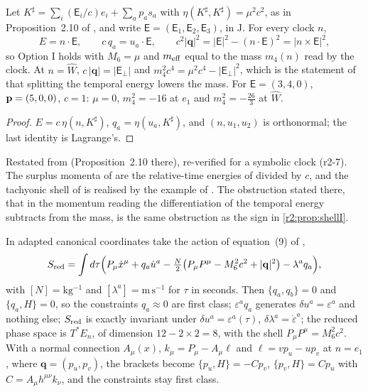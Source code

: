\begin{proposition}
\label{r2:prop:RE}
Let $K^\sharp=\sum_i(\mathsf E_i/c)e_i+\sum_ap_as_a$ with $\eta(K^\sharp,K^\sharp)=\mu^2c^2$, as in Proposition~2.10 of \cite{RE}, and write
$\boldsymbol{\mathsf E}=(\mathsf E_1,\mathsf E_2,\mathsf E_3)$, in $\mathrm J$. For every clock $n$,
\[
E=n\cdot\boldsymbol{\mathsf E},\qquad c\,q_a=u_a\cdot\boldsymbol{\mathsf E},\qquad c^2|\mathbf q|^2=|\boldsymbol{\mathsf E}|^2-(n\cdot\boldsymbol{\mathsf E})^2
=|n\times\boldsymbol{\mathsf E}|^2,
\]
so Option I holds with $M_6=\mu$ and $m_{\rm eff}$ equal to the mass $m_4(n)$ read by the clock. At $n=\widehat W$, $c\,|\mathbf q|=|\boldsymbol{\mathsf E}_\perp|$
and $m_4^2c^4=\mu^2c^4-|\boldsymbol{\mathsf E}_\perp|^2$, which is the statement of \cite{RE} that splitting the temporal energy lowers the mass. For
$\boldsymbol{\mathsf E}=(3,4,0)$, $\mathbf p=(5,0,0)$, $c=1$: $\mu=0$, $m_4^2=-16$ at $e_1$ and $m_4^2=-\tfrac{26}3$ at $\widehat W$.
\end{proposition}

\begin{proof}
$E=c\,\eta(n,K^\sharp)$, $q_a=\eta(u_a,K^\sharp)$, and $(n,u_1,u_2)$ is orthonormal; the last identity is Lagrange's.
\end{proof}

Restated from \cite{RE} (Proposition~2.10 there), re-verified for a symbolic clock (r2-7). The surplus momenta of \cite{FMB} are the relative-time
energies of \cite{RE} divided by $c$, and the tachyonic shell of \cite{FMB} is realised by the example of \cite{RE}. The obstruction stated there, that in the momentum reading the
differentiation of the temporal energy subtracts from the mass, is the same obstruction as the sign in \cref{r2:prop:shellI}.

\begin{proposition}
\label{r2:prop:shellII}
In adapted canonical coordinates take the action of equation~(9) of \cite{FMB},
\[
S_{\rm red}=\int d\tau\Bigl(P_\mu\dot x^\mu+q_a\dot u^a-\tfrac N2\bigl(P_\mu P^\mu-M_6^2c^2+|\mathbf q|^2\bigr)-\lambda^aq_a\Bigr),
\]
with $[N]=\mathrm{kg^{-1}}$ and $[\lambda^a]=\mathrm{m\,s^{-1}}$ for $\tau$ in seconds. Then $\{q_a,q_b\}=0$ and $\{q_a,H\}=0$, so the constraints $q_a\approx0$ are
first class; $\varepsilon^aq_a$ generates $\delta u^a=\varepsilon^a$ and nothing else; $S_{\rm red}$ is exactly invariant under $\delta u^a=\varepsilon^a(\tau)$,
$\delta\lambda^a=\dot\varepsilon^a$; the reduced phase space is $T^*E_n$, of dimension $12-2\times2=8$, with the shell $P_\mu P^\mu=M_6^2c^2$. With a normal
connection $A_\mu(x)$, $k_\mu=P_\mu-A_\mu\ell$ and $\ell=vp_u-up_v$ at $n=e_1$, where $\mathbf q=(p_u,p_v)$, the brackets become $\{p_u,H\}=-Cp_v$, $\{p_v,H\}=Cp_u$ with $C=A_\mu
h^{\mu\nu}k_\nu$, and the constraints stay first class.
\end{proposition}

